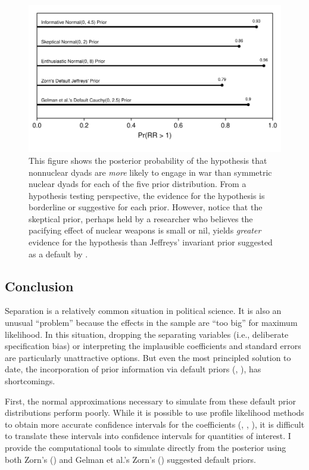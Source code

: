 \documentclass[12pt]{article}
\begin{document}
\begin{figure}[H]
\begin{center}
\includegraphics[scale = .8]{figs/bm-pr-hypothesis.pdf}
\caption{This figure shows the posterior probability of the hypothesis that nonnuclear dyads are \emph{more} likely to engage in war than symmetric nuclear dyads for each of the five prior distribution. From a hypothesis testing perspective, the evidence for the hypothesis is borderline or suggestive for each prior. However, notice that the skeptical prior, perhaps held by a researcher who believes the pacifying effect of nuclear weapons is small or nil, yields \emph{greater} evidence for the hypothesis than Jeffreys' invariant prior suggested as a default by \cite{Zorn2005}.}\label{fig:bm-pr-hypothesis}
\end{center}
\end{figure}

\subsection*{Conclusion}

Separation is a relatively common situation in political science. It is also an unusual ``problem'' because the effects in the sample are ``too big'' for maximum likelihood. In this situation, dropping the separating variables (i.e., deliberate specification bias) or interpreting the implausible coefficients and standard errors are particularly unattractive options. But even the most principled solution to date, the incorporation of prior information via default priors (\citealt{Zorn2005}, \citealt{Gelmanetal2008}), has shortcomings.

First, the normal approximations necessary to simulate from these default prior distributions perform poorly. While it is possible to use profile likelihood methods to obtain more accurate confidence intervals for the coefficients (\citealt{Zorn2005}, \cite{HeinzeSchemper2002}, \cite{McCullaghNelder1989}), it is difficult to translate these intervals into confidence intervals for quantities of interest. I provide the computational tools to simulate directly from the posterior using both Zorn's (\citeyear{Zorn2005}) and Gelman et al.'s Zorn's (\citeyear{Gelmanetal2008}) suggested default priors.
\end{document}
